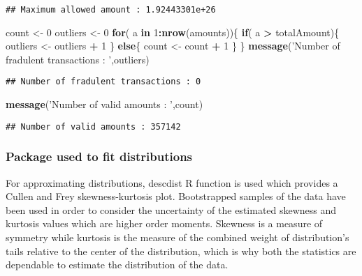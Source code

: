 \documentclass[]{article}
\newenvironment{Shaded}{\begin{snugshade}}{\end{snugshade}}
\newcommand{\KeywordTok}[1]{\textcolor[rgb]{0.13,0.29,0.53}{\textbf{#1}}}
\newcommand{\DecValTok}[1]{\textcolor[rgb]{0.00,0.00,0.81}{#1}}
\newcommand{\StringTok}[1]{\textcolor[rgb]{0.31,0.60,0.02}{#1}}
\newcommand{\ControlFlowTok}[1]{\textcolor[rgb]{0.13,0.29,0.53}{\textbf{#1}}}
\newcommand{\OperatorTok}[1]{\textcolor[rgb]{0.81,0.36,0.00}{\textbf{#1}}}
\newcommand{\NormalTok}[1]{#1}
\begin{document}
\begin{verbatim}
## Maximum allowed amount : 1.92443301e+26
\end{verbatim}

\begin{Shaded}
\begin{Highlighting}[]
\NormalTok{count <-}\StringTok{ }\DecValTok{0}
\NormalTok{outliers <-}\StringTok{ }\DecValTok{0}
\ControlFlowTok{for}\NormalTok{( a }\ControlFlowTok{in} \DecValTok{1}\OperatorTok{:}\KeywordTok{nrow}\NormalTok{(amounts))\{}
  \ControlFlowTok{if}\NormalTok{( a }\OperatorTok{>}\StringTok{ }\NormalTok{totalAmount)\{}
\NormalTok{    outliers <-}\StringTok{ }\NormalTok{outliers }\OperatorTok{+}\StringTok{ }\DecValTok{1}
\NormalTok{  \}}
  \ControlFlowTok{else}\NormalTok{\{}
\NormalTok{    count <-}\StringTok{ }\NormalTok{count }\OperatorTok{+}\StringTok{ }\DecValTok{1}
\NormalTok{  \}}
\NormalTok{\}}
\KeywordTok{message}\NormalTok{(}\StringTok{'Number of fradulent transactions : '}\NormalTok{,outliers)}
\end{Highlighting}
\end{Shaded}

\begin{verbatim}
## Number of fradulent transactions : 0
\end{verbatim}

\begin{Shaded}
\begin{Highlighting}[]
\KeywordTok{message}\NormalTok{(}\StringTok{'Number of valid amounts : '}\NormalTok{,count)}
\end{Highlighting}
\end{Shaded}

\begin{verbatim}
## Number of valid amounts : 357142
\end{verbatim}

\subsubsection{Package used to fit
distributions}\label{package-used-to-fit-distributions}

For approximating distributions, descdist R function is used which
provides a Cullen and Frey skewness-kurtosis plot. Bootstrapped samples
of the data have been used in order to consider the uncertainty of the
estimated skewness and kurtosis values which are higher order moments.
Skewness is a measure of symmetry while kurtosis is the measure of the
combined weight of distribution's tails relative to the center of the
distribution, which is why both the statistics are dependable to
estimate the distribution of the data.
\end{document}
